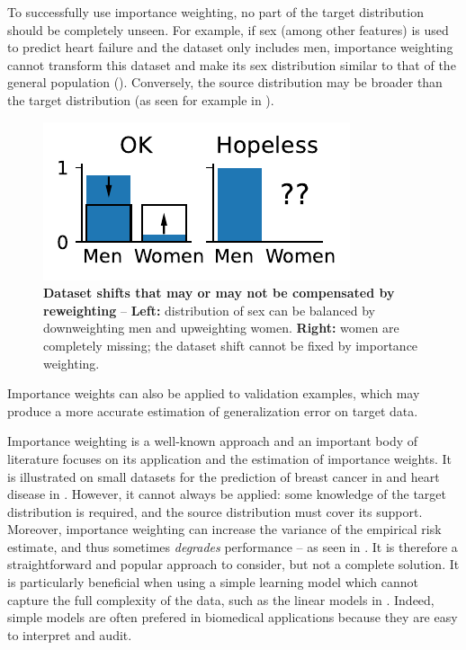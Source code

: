 \documentclass[a4paper,num-refs]{oup-contemporary}
\begin{document}
%

To successfully use importance weighting, no part of the target distribution
should be completely unseen.
%
For example, if sex (among other features) is used to predict heart failure and
the dataset only includes men, importance weighting cannot transform this
dataset and make its sex distribution similar to that of the general population
().
%
Conversely, the source distribution may be broader than the target distribution
(as seen for example in ).
%
\begin{figure}[h]
\centering
\includegraphics[width=.2\textwidth]{figures/simulations/importance_weighting_positivity/importance_weighting_positivity.pdf}
\caption{\textbf{Dataset shifts that may or may not be compensated by
reweighting} -- \textbf{Left:} distribution of sex can be balanced by downweighting
    men and upweighting women. \textbf{Right:} women are completely missing; the
    dataset shift cannot be fixed by importance weighting.}
  \label{fig:importance-weighting-positivity}

\end{figure}

Importance weights can also be applied to validation examples, which may produce a more accurate estimation of generalization error on target data.


Importance weighting is a well-known approach and an important body of literature focuses on its application and the estimation of importance weights.
It is illustrated on small datasets for the prediction of breast cancer in \citet{dudik2006correcting} and heart disease in \citet{kouw2019review}.
However, it cannot always be applied: some knowledge of the target distribution is required, and the source distribution must cover its support.
Moreover, importance weighting can increase the variance of the empirical
risk estimate, and thus sometimes \emph{degrades} performance -- as seen in .
It is therefore a straightforward and popular approach to consider, but not a complete solution.
It is particularly beneficial when using a simple learning model which
cannot capture the full complexity of the data, such as the linear models
in . Indeed, simple models are often prefered in
biomedical applications because they are easy to interpret and audit.
\end{document}
